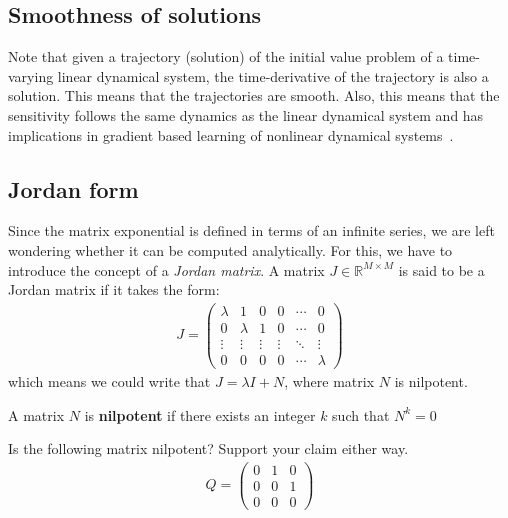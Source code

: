 \documentclass[a4paper,11pt]{exam}
\newcounter{ct}
\newcommand{\field}[1]{\ensuremath{\mathbb{#1}}}
\newcommand{\reals}{\field{R}}
\begin{document}
\begin{questions}
\subsection{Smoothness of solutions}
Note that given a trajectory (solution) of the initial value problem of a time-varying linear dynamical system,
the time-derivative of the trajectory is also a solution.
This means that the trajectories are smooth.
Also, this means that the sensitivity follows the same dynamics as the linear dynamical system and has implications in gradient based learning of nonlinear dynamical systems~\cite{Park2023a}.
\subsection{Jordan form}
Since the matrix exponential is defined in terms of an infinite series, we are left wondering whether it can be computed analytically.
For this, we have to introduce the concept of a \textit{Jordan matrix}.
A matrix $J \in \reals^{M\times M}$ is said to be a Jordan matrix if it takes the form:
\begin{align}
    J = \begin{pmatrix} \lambda & 1 & 0 & 0 & \cdots & 0\\
        0 & \lambda & 1 & 0 & \cdots & 0\\
        \vdots & \vdots & \vdots & \vdots & \ddots & \vdots\\
        0 & 0 & 0 & 0 & \cdots & \lambda
    \end{pmatrix}
\end{align}
which means we could write that $J = \lambda I + N$, where matrix $N$ is nilpotent.

\begin{tcolorbox}[colback=black!1!,title=Nilpotent matrices]
    A matrix $N$ is \textbf{nilpotent} if there exists an integer $k$ such that $N^k = 0$
\end{tcolorbox}

\question Is the following matrix nilpotent? Support your claim either way.
\begin{align}
    Q = \begin{pmatrix} 0 & 1 & 0\\
    0 & 0 & 1\\
    0 & 0 & 0
\end{pmatrix}
\end{align}



\end{questions}
\end{document}
